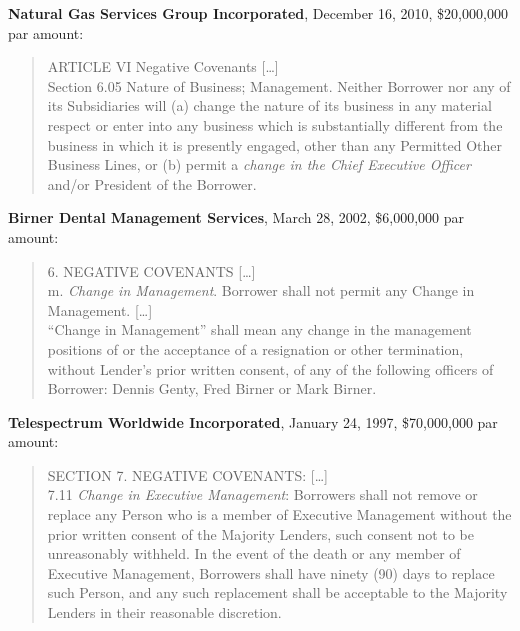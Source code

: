 \documentclass[12pt]{article}
\begin{document}
\begin{appendices}
\noindent
\textbf{Natural Gas Services Group Incorporated}, December 16, 2010, \$20,000,000 par amount:
\begin{quote}
\singlespacing \vspace{-8pt}
ARTICLE VI Negative Covenants  [\dots]\\
Section 6.05 Nature of Business; Management. Neither Borrower nor any of its Subsidiaries will (a) change the nature of its business in any material respect or enter into any business which is substantially different from the business in which it is presently engaged, other than any Permitted Other Business Lines, or (b) permit a \textit{change in the Chief Executive Officer} and/or President of the Borrower.
\end{quote}


\noindent
\textbf{Birner Dental Management Services}, March 28, 2002, \$6,000,000 par amount:
\begin{quote}
\singlespacing \vspace{-8pt}
6. NEGATIVE COVENANTS  [\dots]\\
m. \textit{Change in Management}. Borrower shall not permit any Change in Management.  [\dots]\\
``Change in Management'' shall mean any change in the management positions of or the acceptance of a resignation or other termination, without Lender's prior written consent, of any of the following officers of Borrower: Dennis Genty, Fred Birner or Mark Birner.
\end{quote}

\vspace{0.1in}

\noindent
\textbf{Telespectrum Worldwide Incorporated}, January 24, 1997, \$70,000,000 par amount:
\begin{quote}
\singlespacing \vspace{-8pt}
SECTION 7. NEGATIVE COVENANTS:  [\dots]\\
7.11 \textit{Change in Executive Management}: Borrowers shall not remove or replace any Person who is a member of Executive Management without the prior written consent of the Majority Lenders, such consent not to be unreasonably withheld. In the event of the death or any member of Executive Management, Borrowers shall have ninety (90) days to replace such Person, and any such replacement shall be acceptable to the Majority Lenders in their reasonable discretion.
\end{quote}



\end{appendices}
\end{document}
